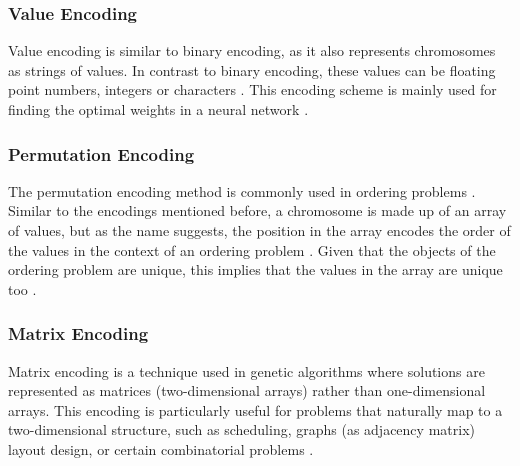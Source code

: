 \documentclass[sigconf]{acmart}
\begin{document}
\subsubsection{Value Encoding}
Value encoding is similar to binary encoding, as it also represents chromosomes
as strings of values. In contrast to binary encoding, these values can be
floating point numbers, integers or characters \cite{Katoch2021}.
This encoding scheme is mainly used for finding the optimal weights in a
neural network \cite{Katoch2021}.

\subsubsection{Permutation Encoding}
The permutation encoding method is commonly used in ordering problems
\cite{Katoch2021}. Similar to the encodings mentioned before, a chromosome
is made up of an array of values, but as the name suggests, the position in
the array encodes the order of the values in the context of an ordering problem
\cite{Katoch2021,Affenzeller2009}. Given that the objects of the ordering
problem are unique, this implies that the values in the array are unique too
\cite{Affenzeller2009}.

\subsubsection{Matrix Encoding}
Matrix encoding is a technique used in genetic algorithms where solutions are
represented as matrices (two-dimensional arrays) rather than one-dimensional
arrays. This encoding is particularly useful for problems that
naturally map to a two-dimensional structure, such as scheduling, graphs
(as adjacency matrix) layout design, or certain combinatorial problems
\cite{Affenzeller2009}.



\end{document}
